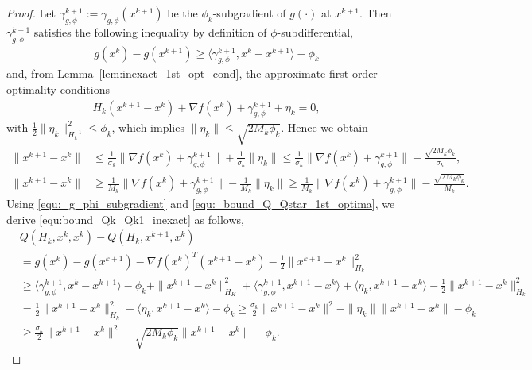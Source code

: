 \documentclass[11pt]{article}
\numberwithin{equation}{section}
\begin{document}
\begin{proof}
	Let $\gamma_{g, \phi}^{k+1}:=\gamma_{g, \phi}(x^{k+1})$ be the $\phi_k$-subgradient of $g(\cdot)$ at $x^{k+1}$. Then $\gamma_{g, \phi}^{k+1}$ satisfies the following inequality by definition of $\phi$-subdifferential,
	\begin{align}
        \label{equ:_g_phi_subgradient}
        g(x^k) - g(x^{k+1}) 
        \geq 
        \langle \gamma_{g, \phi}^{k+1}, x^k-x^{k+1} \rangle - \phi_k
    \end{align}
	and, from Lemma~\ref{lem:inexact_1st_opt_cond}, the approximate first-order optimality conditions
    \begin{align}
        \label{equ:_bound_Q_Qstar_1st_optima}
        H_k(x^{k+1}-x^k) + \nabla f(x^k) + \gamma_{g, \phi}^{k+1}+\eta_k= 0,
    \end{align}
    with $\frac{1}{2}\|\eta_k\|^2_{H_k^{-1}}\leq \phi_k$, which implies $\|\eta_k\| \leq \sqrt{2M_k\phi_k}$. Hence we obtain
    \begin{align*}
		\| x^{k+1} - x^k\|
		&\leq  \frac{1}{\sigma_k}\|  \nabla f(x^k) + \gamma_{g, \phi}^{k+1} \| + \frac{1}{\sigma_k}\|\eta_k\|
		\leq  
		\frac{1}{\sigma_k}\|  \nabla f(x^k) + \gamma_{g, \phi}^{k+1} \| + \frac{\sqrt{2M_k\phi_k}}{\sigma_k}, \\
		\| x^{k+1} - x^k\|
		&\geq   \frac{1}{M_k}\|  \nabla f(x^k) + \gamma_{g, \phi}^{k+1} \|-   \frac{1}{M_k}\|\eta_k\|
		\geq   
		\frac{1}{M_k}\|  \nabla f(x^k) + \gamma_{g, \phi}^{k+1} \|- \frac{\sqrt{2M_k\phi_k}}{M_k}.
	\end{align*}
	Using \eqref{equ:_g_phi_subgradient} and \eqref{equ:_bound_Q_Qstar_1st_optima}, we derive \eqref{equ:bound_Qk_Qk1_inexact} as follows,
	\begin{align*}
	        &Q(H_k,x^k,x^k) - Q(H_k,x^{k+1}, x^k) \\
	        &= g(x^k) - g(x^{k+1}) 
	        - \nabla f(x^k)^T( x^{k+1}-x^k)  
	        - \frac{1}{2}\|x^{k+1}-x^k\|^2_{H_k}  \\
	        &\geq \langle \gamma_{g, \phi}^{k+1}, x^{k}-x^{k+1} \rangle 
	        - \phi_k
	        + \|x^{k+1}-x^k\|_{H_K}^2 
	        +  \langle \gamma_{g, \phi}^{k+1}, x^{k+1} - x^{k}\rangle
	        + \langle \eta_k, x^{k+1}-x^k \rangle
	        - \frac{1}{2}\|x^{k+1}-x^k\|^2_{H_k} \\
			&= \frac{1}{2}\|x^{k+1}-x^k\|^2_{H_k} 
			+ \langle \eta_k,  x^{k+1}-x^k \rangle - \phi_k
			\geq \frac{\sigma_k}{2}\|x^{k+1}-x^k\|^2
			- \|\eta_k\|\|x^{k+1}-x^k\| - \phi_k  \\
	        &\geq \frac{\sigma_k}{2}\|x^{k+1}-x^k\|^2-\sqrt{2M_k\phi_k}\|x^{k+1}-x^k\| - \phi_k.
	\end{align*}
\end{proof}
\end{document}
